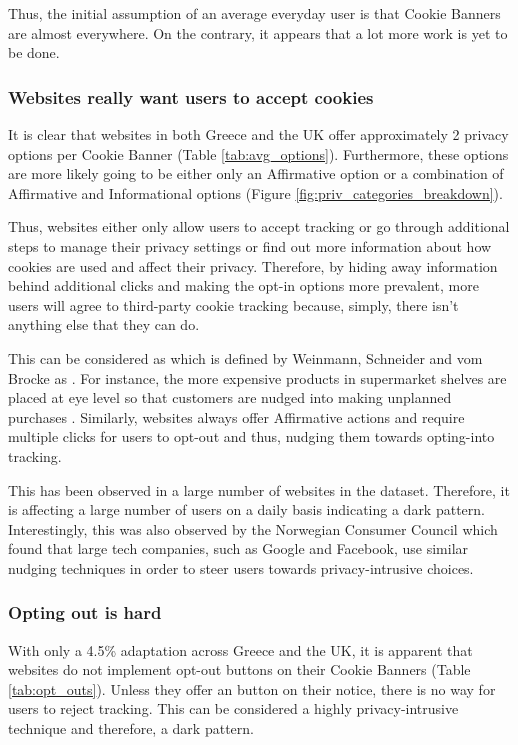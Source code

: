 \documentclass[../main.tex]{subfiles}
\begin{document}
Thus, the initial assumption of an average everyday user is that Cookie Banners are almost everywhere. On the contrary, it appears that a lot more work is yet to be done. 

\subsubsection{Websites really want users to accept cookies}
It is clear that websites in both Greece and the UK offer approximately 2 privacy options per Cookie Banner (Table \ref{tab:avg_options}). Furthermore, these options are more likely going to be either only an Affirmative option or a combination of Affirmative and Informational options (Figure \ref{fig:priv_categories_breakdown}). 

Thus, websites either only allow users to accept tracking or go through additional steps to manage their privacy settings or find out more information about how cookies are used and affect their privacy. Therefore, by hiding away information behind additional clicks and making the opt-in options more prevalent, more users will agree to third-party cookie tracking because, simply, there isn’t anything else that they can do. 

This can be considered as  which is defined by Weinmann, Schneider and vom Brocke as  \cite{weinmann2016digital}. For instance, the more expensive products in supermarket shelves are placed at eye level so that customers are nudged into making unplanned purchases \cite{schneider2018digital}. Similarly, websites always offer Affirmative actions and require multiple clicks for users to opt-out and thus, nudging them towards opting-into tracking.

This has been observed in a large number of websites in the dataset. Therefore, it is affecting a large number of users on a daily basis indicating a dark pattern. Interestingly, this was also observed by the Norwegian Consumer Council \cite{council2018deceived} which found that large tech companies, such as Google and Facebook, use similar nudging techniques in order to steer users towards privacy-intrusive choices.

\subsubsection{Opting out is hard}
With only a 4.5\% adaptation across Greece and the UK, it is apparent that websites do not implement opt-out buttons on their Cookie Banners (Table \ref{tab:opt_outs}). Unless they offer an  button on their notice, there is no way for users to reject tracking. This can be considered a highly privacy-intrusive technique and therefore, a dark pattern. 
\end{document}
